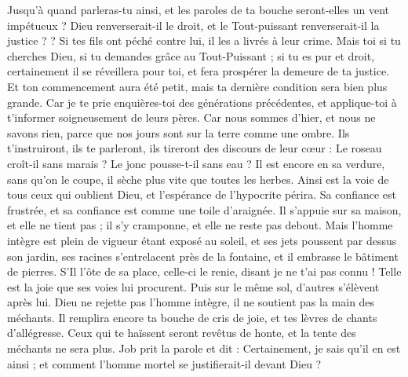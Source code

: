 \begin{multicols}{2}
Jusqu'à quand parleras-tu ainsi, et les paroles de ta bouche seront-elles un vent impétueux ?
Dieu renverserait-il le droit, et le Tout-puissant renverserait-il la justice ?  ?
Si tes fils ont péché contre lui, il les a livrés à leur crime.
Mais toi si tu cherches Dieu, si tu demandes grâce au Tout-Puissant ;
si tu es pur et droit, certainement il se réveillera pour toi, et fera prospérer la demeure de ta justice.
Et ton commencement aura été petit, mais ta dernière condition sera bien plus grande.
Car je te prie enquières-toi des générations précédentes, et applique-toi à t'informer soigneusement de leurs pères.
Car nous sommes d'hier, et nous ne savons rien, parce que nos jours sont sur la terre comme une ombre.
Ils t'instruiront, ils te parleront, ils tireront des discours de leur cœur :
Le roseau croît-il sans marais ? Le jonc pousse-t-il sans eau ?
Il est encore en sa verdure, sans qu'on le coupe, il sèche plus vite que toutes les herbes.
Ainsi est la voie de tous ceux qui oublient Dieu, et l'espérance de l'hypocrite périra.
Sa confiance est frustrée, et sa confiance est comme une toile d'araignée.
Il s'appuie sur sa maison, et elle ne tient pas ; il s'y cramponne, et elle ne reste pas debout.
Mais l'homme intègre est plein de vigueur étant exposé au soleil, et ses jets poussent par dessus son jardin,
ses racines s'entrelacent près de la fontaine, et il embrasse le bâtiment de pierres.
S'Il l'ôte de sa place, celle-ci le renie, disant je ne t'ai pas connu ! 
Telle est la joie que ses voies lui procurent. Puis sur le même sol, d'autres s'élèvent après lui.
Dieu ne rejette pas l'homme intègre, il ne soutient pas la main des méchants.
Il remplira encore ta bouche de cris de joie, et tes lèvres de chants d'allégresse.
Ceux qui te haïssent seront revêtus de honte, et la tente des méchants ne sera plus.
\VerseOne{}Job prit la parole et dit :
Certainement, je sais qu'il en est ainsi ; et comment l'homme mortel se justifierait-il devant Dieu ?

\end{multicols}
